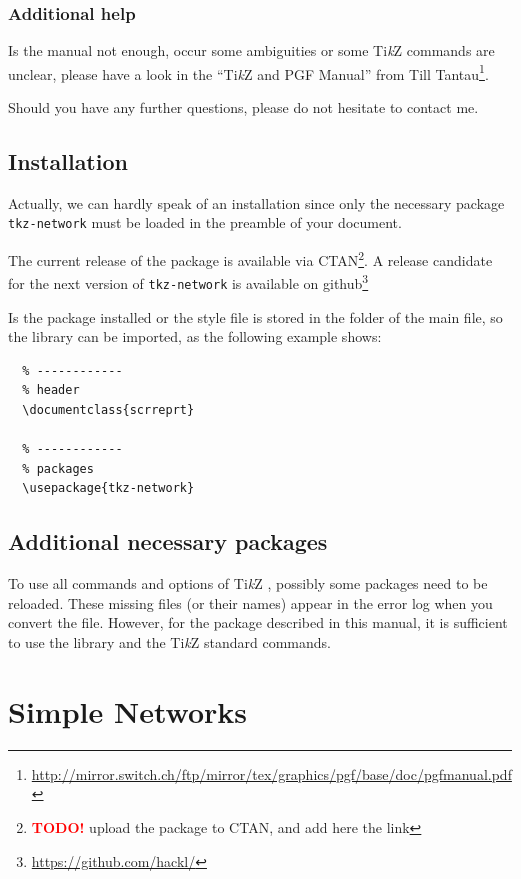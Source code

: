 \documentclass[a4paper,twosided,notoc]{tufte-book}
\newcommand{\TODO}{\textcolor{red}{\bf TODO!}\xspace}
\newcommand{\doccls}[1]{\texttt{#1}}%
\newenvironment{docspec}{\begin{shaded}}{\vspace{-5mm}\end{shaded}}%
\newcommand{\pkg}{\doccls{tkz-network}\xspace}
\newcommand{\tikzsym}{Ti\emph{k}Z }
\begin{document}
\subsection{Additional help}

Is the manual not enough, occur some ambiguities or some \tikzsym commands are unclear, please have a look in the ``\tikzsym and PGF Manual'' from Till Tantau\footnote{\url{http://mirror.switch.ch/ftp/mirror/tex/graphics/pgf/base/doc/pgfmanual.pdf}}.

Should you have any further questions, please do not hesitate to contact me. 

\section{Installation}
\label{sec:Installation}

Actually, we can hardly speak of an installation since only the necessary package \pkg must be loaded in the preamble of your document.

The current release of the package is available via CTAN\footnote{\TODO upload the package to CTAN, and add here the link}. A release candidate for the next version of \pkg is available on github\footnote{\url{https://github.com/hackl/}}

Is the package installed or the style file is stored in the folder of the main file, so the library can be imported, as the following example shows:

\begin{docspec}
\begin{lstlisting}
  % ------------
  % header
  \documentclass{scrreprt}

  % ------------
  % packages
  \usepackage{tkz-network}
\end{lstlisting}
\end{docspec}

\section{Additional necessary packages}

To use all commands and options of \tikzsym, possibly some packages need to be reloaded. These missing files (or their names) appear in the error log when you convert the file. However, for the package described in this manual, it is sufficient to use the library and the \tikzsym standard commands.

\chapter{Simple Networks}
\label{chap:simple_networks}
\end{document}
